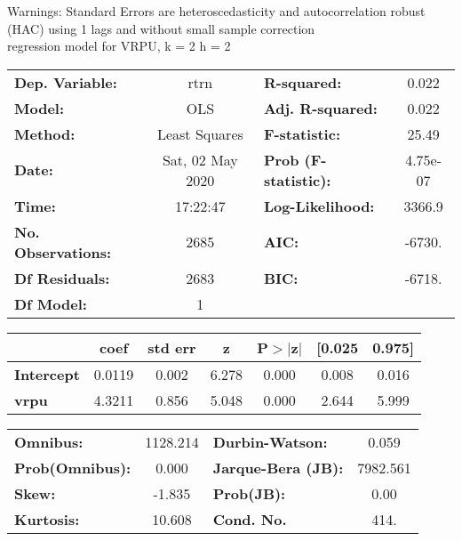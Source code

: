 Warnings: \newline
 [1] Standard Errors are heteroscedasticity and autocorrelation robust (HAC) using 1 lags and without small sample correction\\ 

regression model for VRPU, k = 2 h = 2\begin{center}
\begin{tabular}{lclc}
\toprule
\textbf{Dep. Variable:}    &       rtrn       & \textbf{  R-squared:         } &     0.022   \\
\textbf{Model:}            &       OLS        & \textbf{  Adj. R-squared:    } &     0.022   \\
\textbf{Method:}           &  Least Squares   & \textbf{  F-statistic:       } &     25.49   \\
\textbf{Date:}             & Sat, 02 May 2020 & \textbf{  Prob (F-statistic):} &  4.75e-07   \\
\textbf{Time:}             &     17:22:47     & \textbf{  Log-Likelihood:    } &    3366.9   \\
\textbf{No. Observations:} &        2685      & \textbf{  AIC:               } &    -6730.   \\
\textbf{Df Residuals:}     &        2683      & \textbf{  BIC:               } &    -6718.   \\
\textbf{Df Model:}         &           1      & \textbf{                     } &             \\
\bottomrule
\end{tabular}
\begin{tabular}{lcccccc}
                   & \textbf{coef} & \textbf{std err} & \textbf{z} & \textbf{P$> |$z$|$} & \textbf{[0.025} & \textbf{0.975]}  \\
\midrule
\textbf{Intercept} &       0.0119  &        0.002     &     6.278  &         0.000        &        0.008    &        0.016     \\
\textbf{vrpu}      &       4.3211  &        0.856     &     5.048  &         0.000        &        2.644    &        5.999     \\
\bottomrule
\end{tabular}
\begin{tabular}{lclc}
\textbf{Omnibus:}       & 1128.214 & \textbf{  Durbin-Watson:     } &    0.059  \\
\textbf{Prob(Omnibus):} &   0.000  & \textbf{  Jarque-Bera (JB):  } & 7982.561  \\
\textbf{Skew:}          &  -1.835  & \textbf{  Prob(JB):          } &     0.00  \\
\textbf{Kurtosis:}      &  10.608  & \textbf{  Cond. No.          } &     414.  \\
\bottomrule
\end{tabular}
\end{center}

